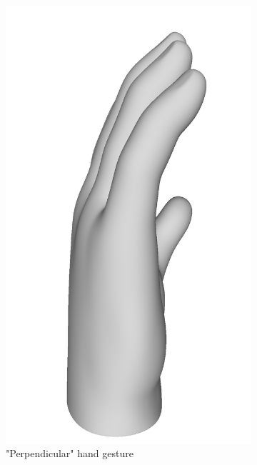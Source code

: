 \documentclass{ieeeaccess}
\begin{document}
\begin{figure}
\begin{subfigure}[b]{0.2\textwidth}
         \includegraphics[width=\textwidth]{smith5.png}
         \caption{"Perpendicular" hand gesture}
         \label{fig:perp}
     \end{subfigure}
     \hfill
     \begin{subfigure}[b]{0.23\textwidth}
         \centering

\end{subfigure}
\end{figure}
\end{document}
